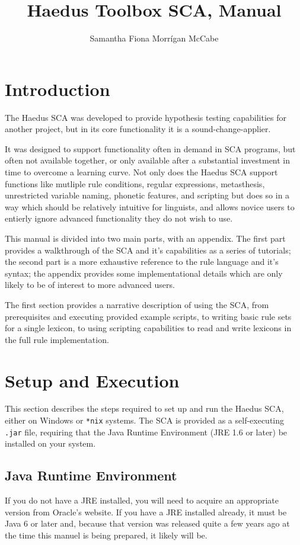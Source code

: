 \documentclass[10pt,letterpaper]{article}
\title{Haedus Toolbox SCA, Manual}
\author{Samantha Fiona Morrígan McCabe}
\begin{document}
\maketitle
\tableofcontents

\section{Introduction}\label{sec:intro}
The Haedus SCA was developed to provide hypothesis testing capabilities for another project, but in its core functionality it is a sound-change-applier.

It was designed to support functionality often in demand in SCA programs, but often not available together, or only available after a substantial investment in time to overcome a learning curve. Not only does the Haedus SCA support functions like mutliple rule conditions, regular expressions, metasthesis, unrestricted variable naming, phonetic features, and scripting but does so in a way which should be relatively intuitive for linguists, and allows novice users to entierly ignore advanced functionality they do not wish to use.

This manual is divided into two main parts, with an appendix. The first part provides a walkthrough of the SCA and it's capabilities as a series of tutorials; the second part is a more exhaustive reference to the rule language and it's syntax; the appendix provides some implementational details which are only likely to be of interest to more advanced users.

The first section provides a narrative description of using the SCA, from prerequisites and executing provided example scripts, to writing basic rule sets for a single lexicon, to using scripting capabilities to read and write lexicons in the full rule implementation.

\section{Setup and Execution}\label{sec:setup}
This section describes the steps required to set up and run the Haedus SCA, either on Windows or \texttt{*nix} systems. The SCA is provided as a self-executing \texttt{.jar} file, requiring that the Java Runtime Environment (JRE 1.6 or later) be installed on your system.

\subsection{Java Runtime Environment}\label{sec:javaruntime}
If you do not have a JRE installed, you will need to acquire an appropriate version from Oracle's website. If you have a JRE installed already, it must be Java 6 or later and, because that version was released quite a few years ago at the time this manuel is being prepared, it likely will be.
\end{document}
